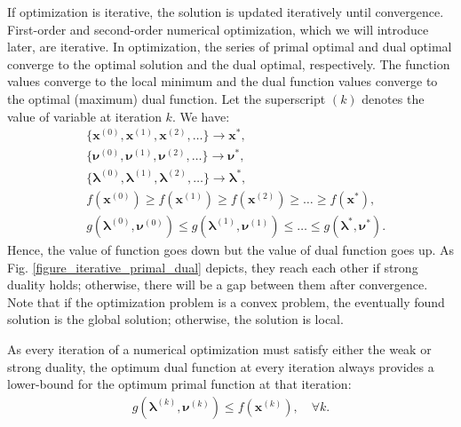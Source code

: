 \documentclass[lang=cn,10pt]{gorgeousnbook}
\numberwithin{equation}{section}%
\numberwithin{figure}{section}%
\begin{document}
If optimization is iterative, the solution is updated iteratively until convergence. First-order and second-order numerical optimization, which we will introduce later, are iterative. 
In optimization, the series of primal optimal and dual optimal converge to the optimal solution and the dual optimal, respectively. The function values converge to the local minimum and the dual function values converge to the optimal (maximum) dual function. Let the superscript $(k)$ denotes the value of variable at iteration $k$. We have:
\begin{equation}\label{equation_iterative_optimization_series}
\begin{aligned}
& \{\boldsymbol{x}^{(0)}, \boldsymbol{x}^{(1)}, \boldsymbol{x}^{(2)}, \dots\} \rightarrow \boldsymbol{x}^*, \\
& \{\boldsymbol{\nu}^{(0)}, \boldsymbol{\nu}^{(1)}, \boldsymbol{\nu}^{(2)}, \dots\} \rightarrow \boldsymbol{\nu}^*, \\
& \{\boldsymbol{\lambda}^{(0)}, \boldsymbol{\lambda}^{(1)}, \boldsymbol{\lambda}^{(2)}, \dots\} \rightarrow \boldsymbol{\lambda}^*, \\
& f(\boldsymbol{x}^{(0)}) \geq f(\boldsymbol{x}^{(1)}) \geq f(\boldsymbol{x}^{(2)}) \geq \dots \geq f(\boldsymbol{x}^*), \\
& g(\boldsymbol{\lambda}^{(0)}, \boldsymbol{\nu}^{(0)}) \leq g(\boldsymbol{\lambda}^{(1)}, \boldsymbol{\nu}^{(1)}) \leq \dots \leq g(\boldsymbol{\lambda}^*, \boldsymbol{\nu}^*).
\end{aligned}
\end{equation}
Hence, the value of function goes down but the value of dual function goes up. As Fig. \ref{figure_iterative_primal_dual} depicts, they reach each other if strong duality holds; otherwise, there will be a gap between them after convergence.
Note that if the optimization problem is a convex problem, the eventually found solution is the global solution; otherwise, the solution is local. 

\begin{corollary}\label{corollary_dual_optimal_lower_bound_primal_optimal_iterative}
As every iteration of a numerical optimization must satisfy either the weak or strong duality, the optimum dual function at every iteration always provides a lower-bound for the optimum primal function at that iteration:
\begin{align}
g(\boldsymbol{\lambda}^{(k)}, \boldsymbol{\nu}^{(k)}) \leq f(\boldsymbol{x}^{(k)}), \quad \forall k.
\end{align}
\end{corollary}
\end{document}
